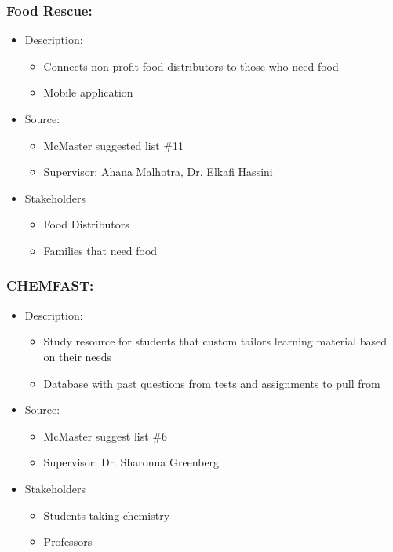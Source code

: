 \documentclass{article}
\begin{document}
\subsubsection*{Food Rescue:}
\label{subsec:foodrescue}
\begin{itemize}
    \item Description:
    \begin{itemize}
        \item Connects non-profit food distributors to those who need food 
        \item Mobile application
    \end{itemize}
    \item Source:
    \begin{itemize}
        \item McMaster suggested list \#11
        \item Supervisor: Ahana Malhotra, Dr. Elkafi Hassini
    \end{itemize}
    \item Stakeholders
    \begin{itemize}
        \item Food Distributors
        \item Families that need food
    \end{itemize}
\end{itemize}

\subsubsection*{CHEMFAST:}
\label{subsec:chemfast}
\begin{itemize}
    \item Description:
    \begin{itemize}
        \item Study resource for students that custom tailors learning material based on their needs
        \item Database with past questions from tests and assignments to pull from
    \end{itemize}
    \item Source:
    \begin{itemize}
        \item McMaster suggest list \#6
        \item Supervisor: Dr. Sharonna Greenberg
    \end{itemize}
    \item Stakeholders
    \begin{itemize}
        \item Students taking chemistry
        \item Professors
    \end{itemize}
\end{itemize}
\end{document}
